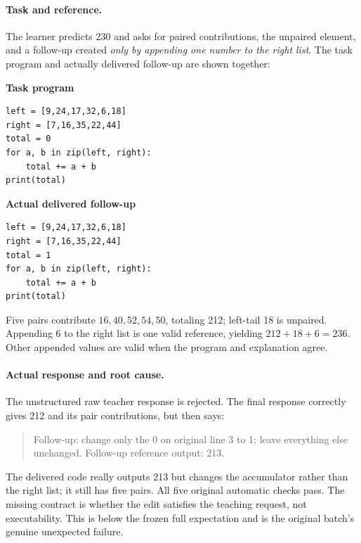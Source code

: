 \paragraph{Task and reference.}
The learner predicts 230 and asks for paired contributions, the unpaired element, and a follow-up created \emph{only by appending one number to the right list}. The task program and actually delivered follow-up are shown together:
\par\noindent\begin{minipage}[t]{0.48\linewidth}\small
\textbf{Task program}\par
\begin{verbatim}
left = [9,24,17,32,6,18]
right = [7,16,35,22,44]
total = 0
for a, b in zip(left, right):
    total += a + b
print(total)
\end{verbatim}
\end{minipage}\hfill
\begin{minipage}[t]{0.48\linewidth}\small
\textbf{Actual delivered follow-up}\par
\begin{verbatim}
left = [9,24,17,32,6,18]
right = [7,16,35,22,44]
total = 1
for a, b in zip(left, right):
    total += a + b
print(total)
\end{verbatim}
\end{minipage}\par
Five pairs contribute $16,40,52,54,50$, totaling 212; left-tail 18 is unpaired. Appending 6 to the right list is one valid reference, yielding $212+18+6=236$. Other appended values are valid when the program and explanation agree.

\paragraph{Actual response and root cause.}
The unstructured raw teacher response is rejected. The final response correctly gives 212 and its pair contributions, but then says:
\begin{quote}\small
Follow-up: change only the 0 on original line 3 to 1; leave everything else unchanged. Follow-up reference output: 213.
\end{quote}
The delivered code really outputs 213 but changes the accumulator rather than the right list; it still has five pairs. All five original automatic checks pass. The missing contract is whether the edit satisfies the teaching request, not executability. This is below the frozen full expectation and is the original batch's genuine unexpected failure.

